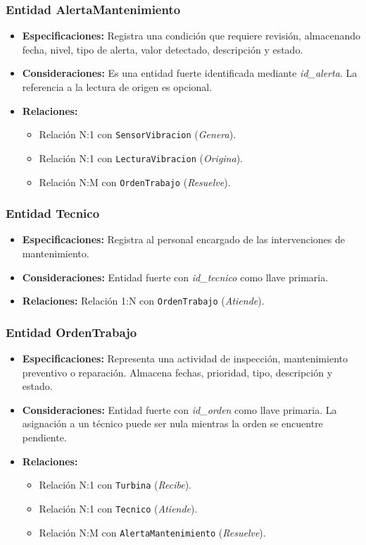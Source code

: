 \documentclass[11pt,a4paper]{article}
\begin{document}
\subsubsection{Entidad AlertaMantenimiento}
\begin{itemize}
    \item \textbf{Especificaciones:} Registra una condición que requiere revisión,
    almacenando fecha, nivel, tipo de alerta, valor detectado, descripción y estado.
    \item \textbf{Consideraciones:} Es una entidad fuerte identificada mediante
    \textit{id\_alerta}. La referencia a la lectura de origen es opcional.
    \item \textbf{Relaciones:}
    \begin{itemize}
        \item Relación N:1 con \texttt{SensorVibracion} (\textit{Genera}).
        \item Relación N:1 con \texttt{LecturaVibracion} (\textit{Origina}).
        \item Relación N:M con \texttt{OrdenTrabajo} (\textit{Resuelve}).
    \end{itemize}
\end{itemize}

\subsubsection{Entidad Tecnico}
\begin{itemize}
    \item \textbf{Especificaciones:} Registra al personal encargado de las
    intervenciones de mantenimiento.
    \item \textbf{Consideraciones:} Entidad fuerte con \textit{id\_tecnico} como
    llave primaria.
    \item \textbf{Relaciones:} Relación 1:N con \texttt{OrdenTrabajo}
    (\textit{Atiende}).
\end{itemize}

\subsubsection{Entidad OrdenTrabajo}
\begin{itemize}
    \item \textbf{Especificaciones:} Representa una actividad de inspección,
    mantenimiento preventivo o reparación. Almacena fechas, prioridad, tipo,
    descripción y estado.
    \item \textbf{Consideraciones:} Entidad fuerte con \textit{id\_orden} como llave
    primaria. La asignación a un técnico puede ser nula mientras la orden se encuentre
    pendiente.
    \item \textbf{Relaciones:}
    \begin{itemize}
        \item Relación N:1 con \texttt{Turbina} (\textit{Recibe}).
        \item Relación N:1 con \texttt{Tecnico} (\textit{Atiende}).
        \item Relación N:M con \texttt{AlertaMantenimiento} (\textit{Resuelve}).
    \end{itemize}
\end{itemize}
\end{document}
